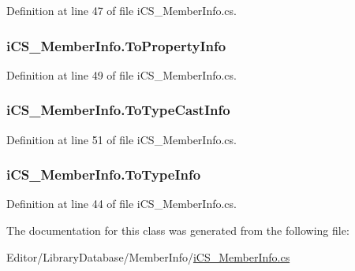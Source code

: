 Definition at line 47 of file i\+C\+S\+\_\+\+Member\+Info.\+cs.

\hypertarget{classi_c_s___member_info_ada8245542dfb5912ae138755e8eaab12}{
\subsubsection[{To\+Property\+Info}]{ i\+C\+S\+\_\+\+Member\+Info.\+To\+Property\+Info\hspace{0.3cm}{\ttfamily [get]}}}\label{classi_c_s___member_info_ada8245542dfb5912ae138755e8eaab12}


Definition at line 49 of file i\+C\+S\+\_\+\+Member\+Info.\+cs.

\hypertarget{classi_c_s___member_info_a160165641d5a1b5ca504d70bf66baa04}{
\subsubsection[{To\+Type\+Cast\+Info}]{ i\+C\+S\+\_\+\+Member\+Info.\+To\+Type\+Cast\+Info\hspace{0.3cm}{\ttfamily [get]}}}\label{classi_c_s___member_info_a160165641d5a1b5ca504d70bf66baa04}


Definition at line 51 of file i\+C\+S\+\_\+\+Member\+Info.\+cs.

\hypertarget{classi_c_s___member_info_a9b41e3b58ed350484d184c7a07fd9680}{
\subsubsection[{To\+Type\+Info}]{ i\+C\+S\+\_\+\+Member\+Info.\+To\+Type\+Info\hspace{0.3cm}{\ttfamily [get]}}}\label{classi_c_s___member_info_a9b41e3b58ed350484d184c7a07fd9680}


Definition at line 44 of file i\+C\+S\+\_\+\+Member\+Info.\+cs.



The documentation for this class was generated from the following file\+:\begin{DoxyCompactItemize}
\item 
Editor/\+Library\+Database/\+Member\+Info/\hyperlink{i_c_s___member_info_8cs}{i\+C\+S\+\_\+\+Member\+Info.\+cs}\end{DoxyCompactItemize}
